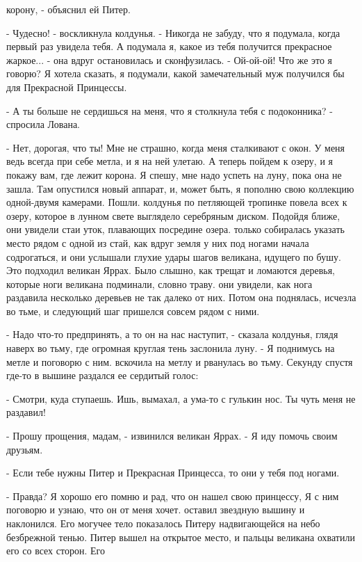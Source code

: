корону, - объяснил ей Питер.
\par- Чудесно! - воскликнула колдунья. - Никогда не забуду, что я 
подумала, когда первый раз увидела тебя. А подумала я, какое из тебя 
получится прекрасное жаркое... - она вдруг остановилась и 
сконфузилась. - Ой-ой-ой! Что же это я говорю? Я хотела сказать, я 
подумали, какой замечательный муж получился бы для Прекрасной 
Принцессы.
\par- А ты больше не сердишься на меня, что я столкнула тебя с 
подоконника? - спросила Лована.
\par- Нет, дорогая, что ты! Мне не страшно, когда меня сталкивают с 
окон. У меня ведь всегда при себе метла, и я на ней улетаю. А теперь 
пойдем к озеру, и я покажу вам, где лежит корона. Я спешу, мне надо 
успеть на луну, пока она не зашла. Там опустился новый аппарат, и, 
может быть, я пополню свою коллекцию одной-двумя камерами. Пошли.
 колдунья по петляющей тропинке повела всех к озеру, которое в 
лунном свете выглядело серебряным диском. Подойдя ближе, они увидели 
стаи уток, плавающих посредине озера.
 только собиралась указать место рядом с одной из стай, 
как вдруг земля у них под ногами начала содрогаться, и они услышали 
глухие удары шагов великана, идущего по бушу. Это подходил великан 
Яррах. Было слышно, как трещат и ломаются деревья, которые ноги 
великана подминали, словно траву.
 они увидели, как нога раздавила несколько деревьев не так 
далеко от них. Потом она поднялась, исчезла во тьме, и следующий шаг 
пришелся совсем рядом с ними.
\par- Надо что-то предпринять, а то он на нас наступит, - сказала 
колдунья, глядя наверх во тьму, где огромная круглая тень заслонила 
луну. - Я поднимусь на метле и поговорю с ним.
 вскочила на метлу и рванулась во тьму. Секунду спустя где-то в 
вышине раздался ее сердитый голос:
\par- Смотри, куда ступаешь. Ишь, вымахал, а ума-то с гулькин нос. Ты 
чуть меня не раздавил!
\par- Прошу прощения, мадам, - извинился великан Яррах. - Я иду помочь 
своим друзьям.
\par- Если тебе нужны Питер и Прекрасная Принцесса, то они у тебя под 
ногами.
\par- Правда? Я хорошо его помню и рад, что он нашел свою принцессу, Я 
с ним поговорю и узнаю, что он от меня хочет.
 оставил звездную вышину и наклонился. Его могучее тело 
показалось Питеру надвигающейся на небо безбрежной тенью. Питер вышел 
на открытое место, и пальцы великана охватили его со всех сторон. Его 
